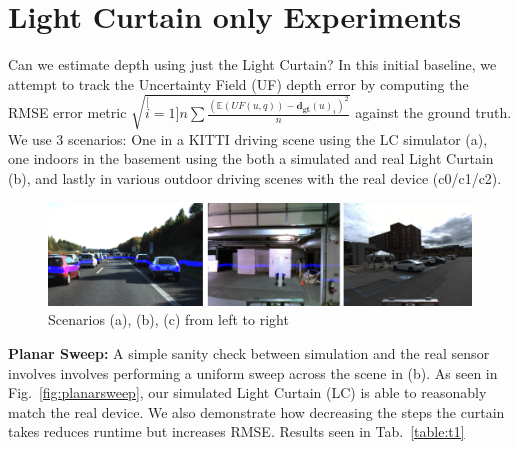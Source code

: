 
\section{Light Curtain only Experiments}

Can we estimate depth using just the Light Curtain? In this initial baseline, we attempt to track the Uncertainty Field (UF) depth error by computing the RMSE error metric $\sqrt{\stackrel[i=1]{n}{\sum}\frac{\left(\mathbb{E}\left(UF\left(u,q\right)\right)-\mathbf{d_{gt}}(u)_{i}\right)^{2}}{n}}$ against the ground truth. We use 3 scenarios: One in a KITTI driving scene using the LC simulator (a), one indoors in the basement using the both a simulated and real Light Curtain (b), and lastly in various outdoor driving scenes with the real device (c0/c1/c2). 

\begin{figure}[h]
   \centering
   \begin{minipage}{0.5\textwidth}
       \centering
       \includegraphics[width=1.0\textwidth]{figures/exp.png}
   \end{minipage}\hfill
   \centering
   \caption{Scenarios (a), (b), (c) from left to right}
   \label{fig:exp}
\end{figure}

\textbf{Planar Sweep:} A simple sanity check between simulation and the real sensor involves involves performing a uniform sweep across the scene in (b). As seen in Fig.~\ref{fig:planarsweep}, our simulated Light Curtain (LC) is able to reasonably match the real device. We also demonstrate how decreasing the steps the curtain takes reduces runtime but increases RMSE. Results seen in Tab.~\ref{table:t1}
 
